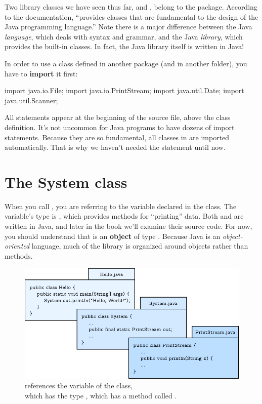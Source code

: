 Two library classes we have seen thus far,  and , belong to the  package. According to the documentation,  ``provides classes that are fundamental to the design of the Java programming language.''
Note there is a major difference between the Java {\em language}, which deals with syntax and grammar, and the Java {\em library}, which provides the built-in classes.
In fact, the Java library itself is written in Java!


In order to use a class defined in another package (and in another folder), you have to {\bf import} it first:

\begin{code}
import java.io.File;
import java.io.PrintStream;
import java.util.Date;
import java.util.Scanner;
\end{code}

All  statements appear at the beginning of the source file, above the class definition.
It's not uncommon for Java programs to have dozens of import statements.
Because they are so fundamental, all classes in  are imported automatically.
That is why we haven't needed the  statement until now.


\section{The System class}
\label{system}


When you call , you are referring to the  variable declared in the  class.
The  variable's type is , which provides methods for ``printing'' data.
Both  and  are written in Java, and later in the book we'll examine their source code.
For now, you should understand that  is an {\bf object} of type .
Because Java is an {\em object-oriented} language, much of the library is organized around objects rather than methods.

\begin{figure}[h!]
\includegraphics{system.pdf}
\caption{ references the  variable of the  class,
\\ which has the type , which has a method called .}
\end{figure}

